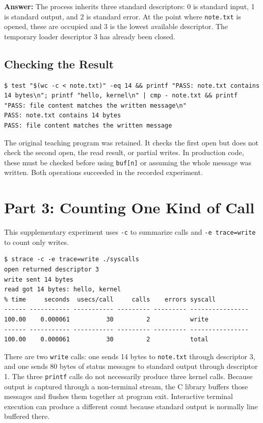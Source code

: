 \documentclass[12pt,a4paper]{article}
\begin{document}
\textbf{Answer:} The process inherits three standard descriptors: 0 is standard
input, 1 is standard output, and 2 is standard error. At the point where
\texttt{note.txt} is opened, these are occupied and 3 is the lowest available
descriptor. The temporary loader descriptor 3 has already been closed.

\subsection{Checking the Result}

\begin{lstlisting}[caption={Checks of the actual byte count and exact file contents}]
$ test "$(wc -c < note.txt)" -eq 14 && printf "PASS: note.txt contains 14 bytes\n"; printf "hello, kernel\n" | cmp - note.txt && printf "PASS: file content matches the written message\n"
PASS: note.txt contains 14 bytes
PASS: file content matches the written message
\end{lstlisting}

The original teaching program was retained. It checks the first open but does not
check the second open, the read result, or partial writes. In production code,
these must be checked before using \texttt{buf[n]} or assuming the whole message
was written. Both operations succeeded in the recorded experiment.

\section{Part 3: Counting One Kind of Call}
\label{sec:count}
This supplementary experiment uses \texttt{-c} to summarize calls and
\texttt{-e trace=write} to count only writes.

\begin{lstlisting}[caption={Counting write calls made by the program}]
$ strace -c -e trace=write ./syscalls
open returned descriptor 3
write sent 14 bytes
read got 14 bytes: hello, kernel
% time     seconds  usecs/call     calls    errors syscall
------ ----------- ----------- --------- --------- ----------------
100.00    0.000061          30         2           write
------ ----------- ----------- --------- --------- ----------------
100.00    0.000061          30         2           total
\end{lstlisting}

There are two \texttt{write} calls: one sends 14 bytes to \texttt{note.txt} through
descriptor 3, and one sends 80 bytes of status messages to standard output through
descriptor 1. The three \texttt{printf} calls do not necessarily produce three
kernel calls. Because output is captured through a non-terminal stream, the C
library buffers those messages and flushes them together at program exit.
Interactive terminal execution can produce a different count because standard
output is normally line buffered there.
\end{document}
